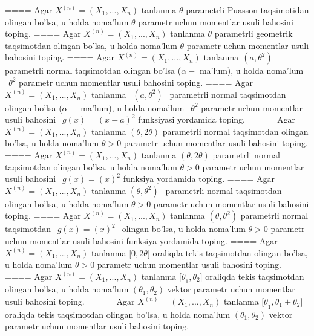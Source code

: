 ====
Agar \(X^{(n)} = \left( X_{1},...,X_{n} \right)\) tanlanma \(\theta\) parametrli Puasson taqsimotidan olingan bo'lsa, u holda noma'lum \(\theta\) parametr uchun momentlar usuli bahosini toping.
====
Agar \(X^{(n)} = \left( X_{1},...,X_{n} \right)\) tanlanma \(\theta\) parametrli geometrik taqsimotdan olingan bo'lsa, u holda noma'lum \(\theta\) parametr uchun momentlar usuli bahosini toping.
====
Agar \(X^{(n)} = \left( X_{1},...,X_{n} \right)\) tanlanma\(\ \ (a,\theta^{2})\) parametrli normal taqsimotdan olingan bo'lsa (\(\alpha -\) ma'lum), u holda noma'lum\(\ \ \theta^{2}\) parametr uchun momentlar usuli bahosini toping.
====
Agar \(X^{(n)} = \left( X_{1},...,X_{n} \right)\) tanlanma \(\ \ (a,\theta^{2})\ \ \) parametrli normal taqsimotdan olingan bo'lsa (\(\alpha -\) ma'lum), u holda noma'lum \(\ \ \theta^{2}\) parametr uchun momentlar usuli bahosini \(\ \ g(x) = (x - a)^{2}\) funksiyasi yordamida toping.
====
Agar \(X^{(n)} = \left( X_{1},...,X_{n} \right)\) tanlanma \((\theta,2\theta)\) parametrli normal taqsimotdan olingan bo'lsa, u holda noma'lum \(\theta > 0\) parametr uchun momentlar usuli bahosini toping.
====
Agar \(X^{(n)} = \left( X_{1},...,X_{n} \right)\) tanlanma \((\theta,2\theta)\) parametrli normal taqsimotdan olingan bo'lsa, u holda noma'lum \(\theta > 0\) parametr uchun momentlar usuli bahosini \(\ \ g(x) = (x)^{2}\) funksiya yordamida toping.
====
Agar \(X^{(n)} = \left( X_{1},...,X_{n} \right)\) tanlanma \((\theta,\theta^{2})\ \ \) parametrli normal taqsimotdan olingan bo'lsa, u holda noma'lum \(\theta > 0\) parametr uchun momentlar usuli bahosini toping.
====
Agar \(X^{(n)} = \left( X_{1},...,X_{n} \right)\) tanlanma \((\theta,\theta^{2})\) parametrli normal taqsimotdan \(\ \ g(x) = (x)^{2}\ \ \) olingan bo'lsa, u holda noma'lum \(\theta > 0\) parametr uchun momentlar usuli bahosini funksiya yordamida toping.
====
Agar \(X^{(n)} = \left( X_{1},...,X_{n} \right)\) tanlanma {[}\(0,2\theta\rbrack\) oraliqda tekis taqsimotdan olingan bo'lsa, u holda noma'lum \(\theta > 0\) parametr uchun momentlar usuli bahosini toping.
====
Agar \(X^{(n)} = \left( X_{1},...,X_{n} \right)\) tanlanma \({\lbrack\theta}_{1},\theta_{2}\rbrack\) oraliqda tekis taqsimotdan olingan bo'lsa, u holda noma'lum \(\left( \theta_{1},\theta_{2} \right)\) vektor parametr uchun momentlar usuli bahosini toping.
====
Agar \(X^{(n)} = \left( X_{1},...,X_{n} \right)\) tanlanma \({\lbrack\theta}_{1},\theta_{1} + \theta_{2}\rbrack\) oraliqda tekis taqsimotdan olingan bo'lsa, u holda noma'lum \(\left( \theta_{1},\theta_{2} \right)\) vektor parametr uchun momentlar usuli bahosini toping.
